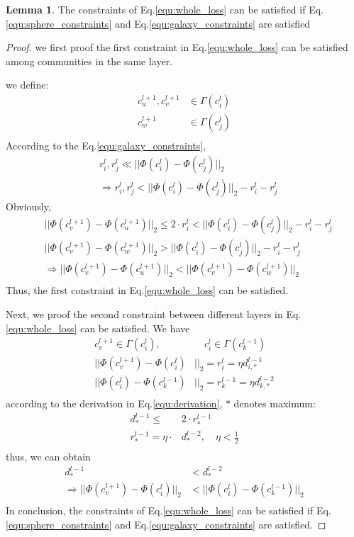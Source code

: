 \documentclass{article}
\theoremstyle{definition}
\newtheorem{lem}{Lemma}
\begin{document}
	 \begin{lem}
	 The constraints of Eq.\ref{equ:whole_loss} can be satisfied if Eq.\ref{equ:sphere_constraints} and Eq.\ref{equ:galaxy_constraints} are satisfied
	 \end{lem}
	 \begin{proof}
	 we first proof the first constraint in Eq.\ref{equ:whole_loss} can be satisfied among communities in the same layer.

	 we define:
	 \[
			\begin{split}
				c_u^{l+1}, c_v^{l+1} &\in \Gamma{(c_i^l)} \\
				c_w^{l+1} &\in \Gamma{(c_j^l)} \\
			\end{split}
	\]
	 According to the Eq.\ref{equ:galaxy_constraints},
	 \[
	 	\begin{split}
	 	&r_i^l, r_j^l \ll ||\Phi(c_i^{l}) - \Phi(c_j^{l})||_2 \\
	 	&\Rightarrow r_i^l, r_j^l < ||\Phi(c_i^{l}) - \Phi(c_j^{l})||_2-r_i^l-r_j^l
	 	\end{split}
	 \]
	 Obviously,
	 \[
	 \begin{split}
	 &||\Phi(c_v^{l+1}) - \Phi(c_u^{l+1})||_2 \le 2 \cdot r_i^l < ||\Phi(c_i^{l}) - \Phi(c_j^{l})||_2-r_i^l-r_j^l \\
	 &||\Phi(c_v^{l+1}) - \Phi(c_w^{l+1})||_2 > ||\Phi(c_i^{l}) - \Phi(c_j^{l})||_2-r_i^l-r_j^l\\
	 &\Rightarrow ||\Phi(c_v^{l+1}) - \Phi(c_u^{l+1})||_2 < ||\Phi(c_v^{l+1}) - \Phi(c_w^{l+1})||_2\\
	 \end{split}
	 \]
	 Thus, the first constraint in Eq.\ref{equ:whole_loss} can be satisfied.

	 Next, we proof the second constraint between different layers in Eq.\ref{equ:whole_loss} can be satisfied. We have
	 \[
	 	\begin{split}
				c_v^{l+1} \in \Gamma{(c_i^l)}, &\quad c_i^l \in \Gamma(c_k^{l-1})\\
				||\Phi(c_v^{l+1}) - \Phi(c_i^{l})&||_2 = r_i^l = \eta d_{i, *}^{l-1} \\
				||\Phi(c_i^{l}) - \Phi(c_k^{l-1})&||_2 = r_k^{l-1} = \eta d_{k, *}^{l-2} \\ 
		\end{split}	
	 \]
	 according to the derivation in Eq.\ref{equ:derivation}, $*$ denotes maximum:
	 \[
	 	\begin{split}
	 		d_*^{l-1} \le &2 \cdot r_*^{l-1} \\
	 		r_*^{l-1} = \eta \cdot &d_*^{l-2}, \quad \eta < \frac{1}{2}  \\
	 	\end{split}
	 \]
	 thus, we can obtain
	 \[
	 	\begin{split}
	 		d_*^{l-1} &< d_*^{l-2} \\
	 		\Rightarrow ||\Phi(c_v^{l+1}) - \Phi(c_i^{l})||_2 &< ||\Phi(c_i^{l}) - \Phi(c_k^{l-1})||_2\\
	 	\end{split}
	 \] 
	 In conclusion, the constraints of Eq.\ref{equ:whole_loss} can be satisfied if Eq.\ref{equ:sphere_constraints} and Eq.\ref{equ:galaxy_constraints} are satisfied.
	 \end{proof}
\end{document}
